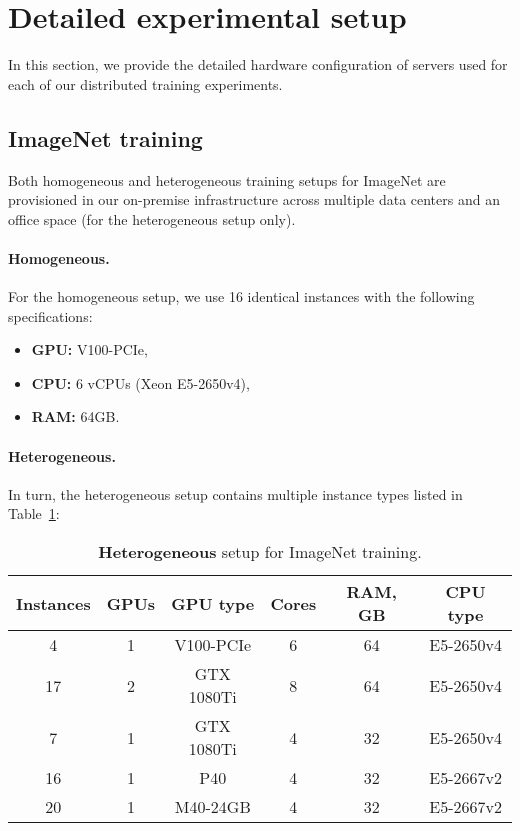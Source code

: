 \section{Detailed experimental setup}
\label{sect:detailed_setup}

In this section, we provide the detailed hardware configuration of servers used for each of our distributed training experiments.

\subsection{ImageNet training}\label{sect:detailed_setup_resnet}

Both homogeneous and heterogeneous training setups for ImageNet are provisioned in our on-premise infrastructure across multiple data centers and an office space (for the heterogeneous setup only).

\paragraph{Homogeneous.}For the homogeneous setup, we use 16 identical instances with the following specifications:
\begin{itemize}
    \item \textbf{GPU:} V100-PCIe,
    \item \textbf{CPU:} 6 vCPUs (Xeon E5-2650v4),
    \item \textbf{RAM:} 64GB.
\end{itemize}

\paragraph{Heterogeneous.}In turn, the heterogeneous setup contains multiple instance types listed in Table~\ref{fig:tab_setup_resnet}:
\begin{table}[h]
\centering
\caption{\textbf{Heterogeneous} setup for ImageNet training.}
\label{fig:tab_setup_resnet}
\renewcommand{\arraystretch}{1}
\begin{tabular}{@{}cccccc@{}}
\toprule
Instances & GPUs & GPU type & Cores & RAM, GB & CPU type \\ 
\midrule
4            & 1      & V100-PCIe  & 6        & 64     & E5-2650v4 \\
17           & 2      & GTX 1080Ti & 8        & 64     & E5-2650v4 \\
7            & 1      & GTX 1080Ti & 4        & 32     & E5-2650v4 \\
16           & 1      & P40  & 4        & 32     & E5-2667v2 \\
20           & 1      & M40-24GB  & 4        & 32     & E5-2667v2 \\

\bottomrule
\end{tabular}
\end{table}




